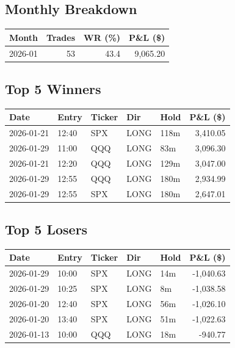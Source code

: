 \documentclass[11pt,a4paper,twoside]{article}
\begin{document}
\subsection{Monthly Breakdown}
\noindent\begin{center}
\begin{tabular}{>{\color{txtmain}}l rrr}
\toprule
\rowcolor{cardbg}
\textbf{Month} & \textbf{Trades} & \textbf{WR (\%)} & \textbf{P\&L (\$)} \\
\midrule
2026-01 & 53 & 43.4 & \textcolor{wingreen}{9,065.20} \\
\bottomrule
\end{tabular}
\end{center}
\subsection{Top 5 Winners}
\noindent\begin{center}
\begin{tabular}{>{\color{txtmain}}l llll r}
\toprule
\rowcolor{cardbg}
\textbf{Date} & \textbf{Entry} & \textbf{Ticker} & \textbf{Dir} & \textbf{Hold} & \textbf{P\&L (\$)} \\
\midrule
2026-01-21 & 12:40 & SPX & LONG & 118m & \textcolor{wingreen}{3,410.05} \\
2026-01-29 & 11:00 & QQQ & LONG & 83m & \textcolor{wingreen}{3,096.30} \\
2026-01-21 & 12:20 & QQQ & LONG & 129m & \textcolor{wingreen}{3,047.00} \\
2026-01-29 & 12:55 & QQQ & LONG & 180m & \textcolor{wingreen}{2,934.99} \\
2026-01-29 & 12:55 & SPX & LONG & 180m & \textcolor{wingreen}{2,647.01} \\
\bottomrule
\end{tabular}
\end{center}
\subsection{Top 5 Losers}
\noindent\begin{center}
\begin{tabular}{>{\color{txtmain}}l llll r}
\toprule
\rowcolor{cardbg}
\textbf{Date} & \textbf{Entry} & \textbf{Ticker} & \textbf{Dir} & \textbf{Hold} & \textbf{P\&L (\$)} \\
\midrule
2026-01-29 & 10:00 & SPX & LONG & 14m & \textcolor{lossred}{-1,040.63} \\
2026-01-29 & 10:25 & SPX & LONG & 8m & \textcolor{lossred}{-1,038.58} \\
2026-01-20 & 12:40 & SPX & LONG & 56m & \textcolor{lossred}{-1,026.10} \\
2026-01-20 & 13:40 & SPX & LONG & 51m & \textcolor{lossred}{-1,022.63} \\
2026-01-13 & 10:00 & QQQ & LONG & 18m & \textcolor{lossred}{-940.77} \\
\bottomrule
\end{tabular}
\end{center}
\clearpage
\end{document}
